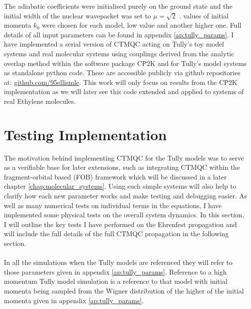 The adiabatic coefficients were initialised purely on the ground state and the initial width of the nuclear wavepacket was set to $\mu = \sqrt{2}$ .   values of initial momenta $k_0$ were chosen for each model,  low value and another higher one. Full details of all input parameters can be found in appendix \ref{ap:tully_params}. I have implemented a serial version of CTMQC acting on Tully's toy model systems and real molecular systems using couplings derived from the analytic overlap method \cite{gajdos_ultrafast_2014} within the software package CP2K \cite{cp2k} and for Tully's model systems as standalone python code. These are accessible publicly via github repositories at: \href{https://github.com/95ellismle}{github.com/95ellismle}. This work will only focus on results from the CP2K implementation as we will later see this code extended and applied to systems of real Ethylene molecules.

\section{Testing  Implementation }
The motivation behind implementing CTMQC for the Tully models was to serve as a verifiable base for later extensions, such as integrating CTMQC within the fragment-orbital based (FOB) \cite{spencer_fob-sh:_2016} framework which will be discussed in a later chapter \ref{chap:molecular_systems}. Using such simple systems will also help to clarify how each new parameter works and make testing and debugging easier. As well as many numerical tests on individual terms in the equations,  I have implemented some physical tests on the overall system dynamics. In this section, I will outline the key tests I have performed on the Ehrenfest propagation and will include the full details of the full CTMQC propagation in the following section.
\\\\
In all the simulations when the Tully models are referenced they will refer to those parameters given in appendix \ref{ap:tully_params}. Reference to a high momentum Tully model simulation is a reference to that model with initial momenta being sampled from the Wigner distribution of the higher of the  initial momenta given in appendix \ref{ap:tully_params}.

